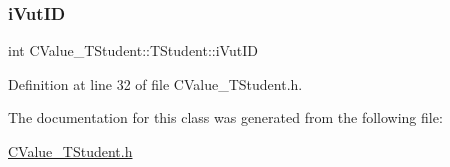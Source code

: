 \subsubsection{\texorpdfstring{i\+Vut\+ID}{iVutID}}
{\footnotesize\ttfamily int C\+Value\+\_\+\+T\+Student\+::\+T\+Student\+::i\+Vut\+ID\hspace{0.3cm}{\ttfamily [private]}}



Definition at line 32 of file C\+Value\+\_\+\+T\+Student.\+h.



The documentation for this class was generated from the following file\+:\begin{DoxyCompactItemize}
\item 
\hyperlink{_c_value___t_student_8h}{C\+Value\+\_\+\+T\+Student.\+h}\end{DoxyCompactItemize}

